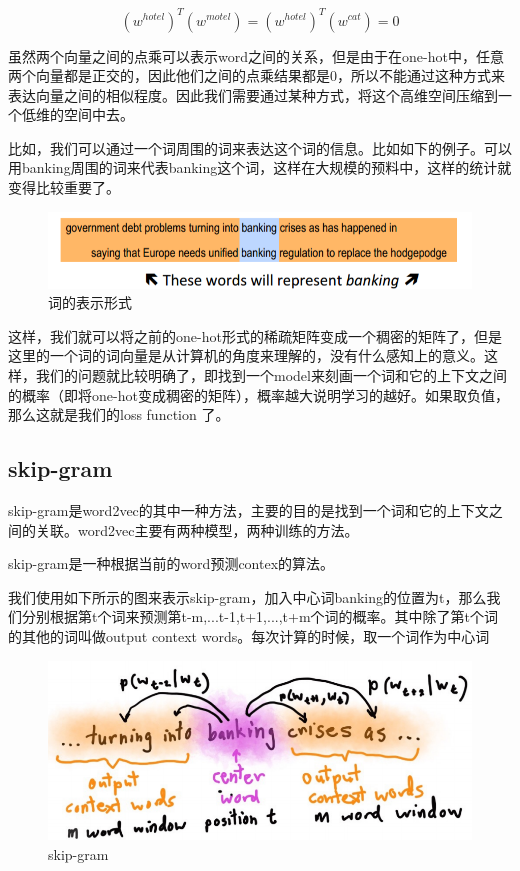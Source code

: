 	\begin{equation}
	(w^{hotel})^{T}(w^{motel}) = (w^{hotel})^{T}(w^{cat})=0
	\end{equation}
	
	虽然两个向量之间的点乘可以表示word之间的关系，但是由于在one-hot中，任意两个向量都是正交的，因此他们之间的点乘结果都是0，所以不能通过这种方式来表达向量之间的相似程度。因此我们需要通过某种方式，将这个高维空间压缩到一个低维的空间中去。	
	
	比如，我们可以通过一个词周围的词来表达这个词的信息。比如如下的例子。可以用banking周围的词来代表banking这个词，这样在大规模的预料中，这样的统计就变得比较重要了。
	
	\begin{figure}[htbp]
	\centering\includegraphics[width=6in]{img/6-2.png}
	\caption{词的表示形式}\label{fig:6-2}
	\end{figure}
	
	这样，我们就可以将之前的one-hot形式的稀疏矩阵变成一个稠密的矩阵了，但是这里的一个词的词向量是从计算机的角度来理解的，没有什么感知上的意义。这样，我们的问题就比较明确了，即找到一个model来刻画一个词和它的上下文之间的概率（即将one-hot变成稠密的矩阵），概率越大说明学习的越好。如果取负值，那么这就是我们的loss function 了。
	
	
	\subsection{skip-gram}
	
	skip-gram是word2vec的其中一种方法，主要的目的是找到一个词和它的上下文之间的关联。word2vec主要有两种模型，两种训练的方法。
	
	skip-gram是一种根据当前的word预测contex的算法。
	
	我们使用如下所示的图来表示skip-gram，加入中心词banking的位置为t，那么我们分别根据第t个词来预测第t-m,...t-1,t+1,...,t+m个词的概率。其中除了第t个词的其他的词叫做output context words。每次计算的时候，取一个词作为中心词
	
	\begin{figure}[htbp]
	\centering\includegraphics[width=6in]{img/6-3.png}
	\caption{skip-gram}\label{fig:6-3}
	\end{figure}
	
